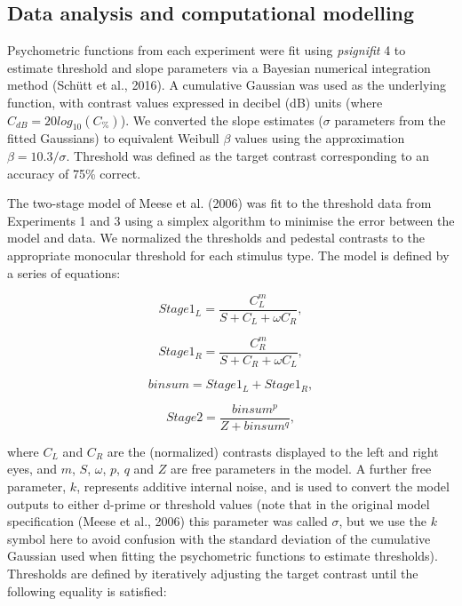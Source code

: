 \documentclass[
  letterpaper,
  DIV=11,
  numbers=noendperiod]{scrartcl}
\begin{document}
\hypertarget{data-analysis-and-computational-modelling}{%
\subsection{Data analysis and computational
modelling}\label{data-analysis-and-computational-modelling}}

Psychometric functions from each experiment were fit using
\emph{psignifit} 4 to estimate threshold and slope parameters via a
Bayesian numerical integration method (Schütt et al., 2016). A
cumulative Gaussian was used as the underlying function, with contrast
values expressed in decibel (dB) units (where
\(C_{dB} = 20log_{10}(C_\%)\)). We converted the slope estimates
(\(\sigma\) parameters from the fitted Gaussians) to equivalent Weibull
\(\beta\) values using the approximation \(\beta = 10.3/\sigma\).
Threshold was defined as the target contrast corresponding to an
accuracy of 75\% correct.

The two-stage model of Meese et al. (2006) was fit to the threshold data
from Experiments 1 and 3 using a simplex algorithm to minimise the error
between the model and data. We normalized the thresholds and pedestal
contrasts to the appropriate monocular threshold for each stimulus type.
The model is defined by a series of equations:

\begin{equation}
Stage1_L = \frac{C_L^m}{S + C_L + \omega C_R},
\end{equation}

\begin{equation}
Stage1_R = \frac{C_R^m}{S + C_R + \omega C_L},
\end{equation}

\begin{equation}
binsum = Stage1_L + Stage1_R,
\end{equation}

\begin{equation}
Stage2 = \frac{binsum^p}{Z + binsum^q},
\end{equation}

where \(C_L\) and \(C_R\) are the (normalized) contrasts displayed to
the left and right eyes, and \(m\), \(S\), \(\omega\), \(p\), \(q\) and
\(Z\) are free parameters in the model. A further free parameter, \(k\),
represents additive internal noise, and is used to convert the model
outputs to either d-prime or threshold values (note that in the original
model specification (Meese et al., 2006) this parameter was called
\(\sigma\), but we use the \(k\) symbol here to avoid confusion with the
standard deviation of the cumulative Gaussian used when fitting the
psychometric functions to estimate thresholds). Thresholds are defined
by iteratively adjusting the target contrast until the following
equality is satisfied:
\end{document}
